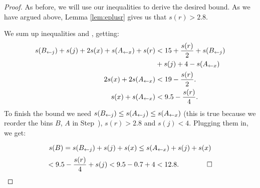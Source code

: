 \begin{proof}
As before, we will use our inequalities to derive the desired
bound. As we have argued above, Lemma \ref{lem:eplusr} gives us that
$s(r) > 2.8$.

We sum up inequalities  and , getting:
\begin{align*}
 s(B_{\leftarrow j}) + s(j) + 2s(x) + s(A_{\leftarrow x}) + s(r) &< 15 + \frac{s(r)}{2} + s(B_{\leftarrow j})\\
&+ s(j) + 4 - s(A_{\leftarrow x})\\ 
2s(x) + 2s(A_{\leftarrow x}) &< 19 - \frac{s(r)}{2}. \\
s(x) + s(A_{\leftarrow x}) &< 9.5 - \frac{s(r)}{4}. 
\end{align*}
To finish the bound we need $s(B_{\leftarrow j}) \le s(A_{\leftarrow j}) \le s(A_{\leftarrow x})$ (this is true because we reorder the bins
$B$, $A$ in Step~), $s(r) > 2.8$ and $s(j) < 4$. Plugging them in, we get:

\[ s(B) = s(B_{\leftarrow j}) + s(j) + s(x) \le s(A_{\leftarrow x}) + s(j) + s(x) \]
\[ < 9.5 - \frac{s(r)}{4} + s(j) < 9.5 - 0.7 + 4 < 12.8. \qquad \qed\]
\end{proof}

